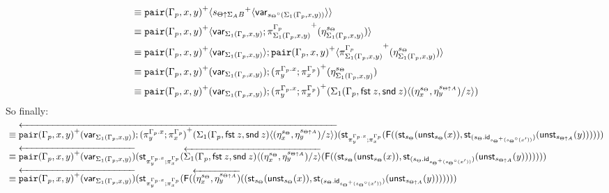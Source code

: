 \documentclass[10pt]{article}
\theoremstyle{definition}
\newcommand\dsd[1]{\ensuremath{\mathsf{#1}}}
\newcommand{\rewrite}[2]{\overleftarrow{#1}(#2)}
\newcommand\StI[2]{\ensuremath{\mathsf{st}_{#1}(#2)}}
\newcommand\UnSt[2]{\ensuremath{\mathsf{unst}_{#1}(#2)}}
\newcommand\FI[1]{\ensuremath{\mathsf{F}{(#1)}}}
\newcommand\TrPlus[2]{\ensuremath{{#1}^+(#2)}}
\newcommand\TrCirc[2]{\ensuremath{{#1}^\circ(#2)}}
\newcommand\var[1]{\ensuremath{\mathsf{var}_{#1}}}
\newcommand{\id}{\mathsf{id}}
\newcommand\ap[2]{\ensuremath{#1 \langle #2 \rangle }}
\newcommand\ApPlus[2]{\ensuremath{{#1}^+ \langle #2 \rangle }}
\newcommand{\app}[2]{\ensuremath{#1 \: #2}}
\newcommand{\fst}[1]{\app{\dsd{fst}}{#1}}
\newcommand{\snd}[1]{\app{\dsd{snd}}{#1}}
\newcommand\bdot[0]{\mathbin{.}}
\begin{document}
\begin{enumerate}[style = multiline, labelwidth = 80pt]
\begin{align*}
&\equiv \ApPlus{\mathtt{pair}(\asdep{\Gamma},x,y)}{\ApPlus{s_{\Theta \uparrow \Sigma_A B}}{\var{\TrCirc{s_\Theta}{\Sigma_1(\asdep{\Gamma},x,y)}}}} \\
&\equiv \ApPlus{\mathtt{pair}(\asdep{\Gamma},x,y)}{\var{\Sigma_1(\asdep{\Gamma},x,y)};\TrPlus{\pi^{\asdep{\Gamma}}_{\Sigma_1(\asdep{\Gamma},x,y)}}{\eta^{s_{\Theta}}_{\Sigma_1(\asdep{\Gamma},x,y)}}} \\
&\equiv \ApPlus{\mathtt{pair}(\asdep{\Gamma},x,y)}{\var{\Sigma_1(\asdep{\Gamma},x,y)}};\ApPlus{\mathtt{pair}(\asdep{\Gamma},x,y)}{\TrPlus{\pi^{\asdep{\Gamma}}_{\Sigma_1(\asdep{\Gamma},x,y)}}{\eta^{s_{\Theta}}_{\Sigma_1(\asdep{\Gamma},x,y)}}} \\
&\equiv \TrPlus{\mathtt{pair}(\asdep{\Gamma},x,y)}{\var{\Sigma_1(\asdep{\Gamma},x,y)}};\TrPlus{(\pi^{\asdep{\Gamma}.x}_y;\pi^{\asdep{\Gamma}}_x)}{\eta^{s_{\Theta}}_{\Sigma_1(\asdep{\Gamma},x,y)}} \\
&\equiv \TrPlus{\mathtt{pair}(\asdep{\Gamma},x,y)}{\var{\Sigma_1(\asdep{\Gamma},x,y)}};\TrPlus{(\pi^{\asdep{\Gamma}.x}_y;\pi^{\asdep{\Gamma}}_x)}{\ap{\Sigma_1(\asdep{\Gamma},\fst z, \snd z)}{(\eta^{s_\Theta}_x, \eta^{s_{\Theta \uparrow A}}_y)/z}}
\end{align*}
So finally:
\begin{align*}
&\equiv \rewrite{\TrPlus{\mathtt{pair}(\asdep{\Gamma},x,y)}{\var{\Sigma_1(\asdep{\Gamma},x,y)}};\TrPlus{(\pi^{\asdep{\Gamma}.x}_y;\pi^{\asdep{\Gamma}}_x)}{\ap{\Sigma_1(\asdep{\Gamma},\fst z, \snd z)}{(\eta^{s_\Theta}_x, \eta^{s_{\Theta \uparrow A}}_y)/z}}}{\StI{\pi^{\asdep{\Gamma}.x}_y;\pi^{\asdep{\Gamma}}_x}{\FI{(\StI{s_\Theta}{\UnSt{s_\Theta}{x}}, \StI{(s_\Theta \bdot \id_{\TrPlus{s_\Theta}{\TrCirc{s_\Theta}{x'}}})}{\UnSt{s_{\Theta \uparrow A}}{y}})}}} \\
&\equiv \rewrite{\TrPlus{\mathtt{pair}(\asdep{\Gamma},x,y)}{\var{\Sigma_1(\asdep{\Gamma},x,y)}}}{\StI{\pi^{\asdep{\Gamma}.x}_y;\pi^{\asdep{\Gamma}}_x}{\rewrite{\ap{\Sigma_1(\asdep{\Gamma},\fst z, \snd z)}{(\eta^{s_\Theta}_x, \eta^{s_{\Theta \uparrow A}}_y)/z}}{\FI{(\StI{s_\Theta}{\UnSt{s_\Theta}{x}}, \StI{(s_\Theta \bdot \id_{\TrPlus{s_\Theta}{\TrCirc{s_\Theta}{x'}}})}{\UnSt{s_{\Theta \uparrow A}}{y}})}}}} \\
&\equiv \rewrite{\TrPlus{\mathtt{pair}(\asdep{\Gamma},x,y)}{\var{\Sigma_1(\asdep{\Gamma},x,y)}}}{\StI{\pi^{\asdep{\Gamma}.x}_y;\pi^{\asdep{\Gamma}}_x}{\FI{\rewrite{(\eta^{s_\Theta}_x, \eta^{s_{\Theta \uparrow A}}_y)}{(\StI{s_\Theta}{\UnSt{s_\Theta}{x}}, \StI{(s_\Theta \bdot \id_{\TrPlus{s_\Theta}{\TrCirc{s_\Theta}{x'}}})}{\UnSt{s_{\Theta \uparrow A}}{y}})}}}} \\

\end{align*}
\end{enumerate}
\end{document}
